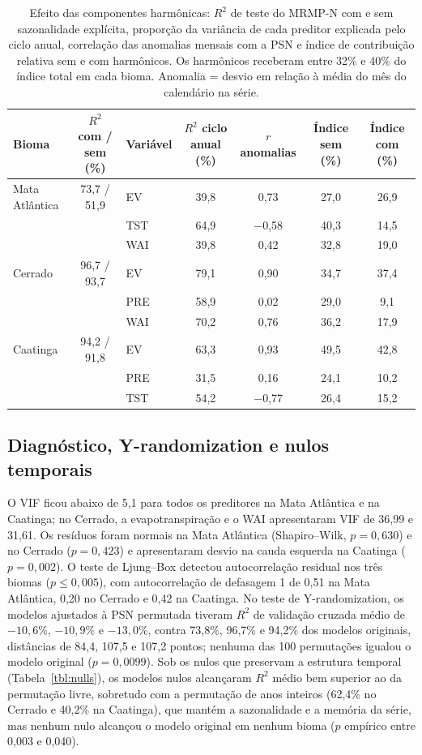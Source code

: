 \documentclass[a4paper,fleqn]{cas-sc}
\begin{document}
\begin{table}[htbp]
\caption{Efeito das componentes harmônicas: $R^2$ de teste do MRMP-N com e sem sazonalidade explícita, proporção da variância de cada preditor explicada pelo ciclo anual, correlação das anomalias mensais com a PSN e índice de contribuição relativa sem e com harmônicos. Os harmônicos receberam entre 32\% e 40\% do índice total em cada bioma. Anomalia = desvio em relação à média do mês do calendário na série.}\label{tbl:harm}
\scriptsize
\begin{tabular*}{\tblwidth}{@{}LCLCCCC@{}}
\toprule
Bioma & $R^2$ com / sem (\%) & Variável & $R^2$ ciclo anual (\%) & $r$ anomalias & Índice sem (\%) & Índice com (\%) \\
\midrule
Mata Atlântica & 73,7 / 51,9 & EV & 39,8 & 0,73 & 27,0 & 26,9 \\
 & & TST & 64,9 & $-$0,58 & 40,3 & 14,5 \\
 & & WAI & 39,8 & 0,42 & 32,8 & 19,0 \\
Cerrado & 96,7 / 93,7 & EV & 79,1 & 0,90 & 34,7 & 37,4 \\
 & & PRE & 58,9 & 0,02 & 29,0 & 9,1 \\
 & & WAI & 70,2 & 0,76 & 36,2 & 17,9 \\
Caatinga & 94,2 / 91,8 & EV & 63,3 & 0,93 & 49,5 & 42,8 \\
 & & PRE & 31,5 & 0,16 & 24,1 & 10,2 \\
 & & TST & 54,2 & $-$0,77 & 26,4 & 15,2 \\
\bottomrule
\end{tabular*}
\end{table}

\subsection{Diagnóstico, Y-randomization e nulos temporais}

O VIF ficou abaixo de 5,1 para todos os preditores na Mata Atlântica e na Caatinga; no Cerrado, a evapotranspiração e o WAI apresentaram VIF de 36,99 e 31,61. Os resíduos foram normais na Mata Atlântica (Shapiro--Wilk, $p = 0,630$) e no Cerrado ($p = 0,423$) e apresentaram desvio na cauda esquerda na Caatinga ($p = 0,002$). O teste de Ljung--Box detectou autocorrelação residual nos três biomas ($p \le 0,005$), com autocorrelação de defasagem 1 de 0,51 na Mata Atlântica, 0,20 no Cerrado e 0,42 na Caatinga. No teste de Y-randomization, os modelos ajustados à PSN permutada tiveram $R^2$ de validação cruzada médio de $-10,6\%$, $-10,9\%$ e $-13,0\%$, contra 73,8\%, 96,7\% e 94,2\% dos modelos originais, distâncias de 84,4, 107,5 e 107,2 pontos; nenhuma das 100 permutações igualou o modelo original ($p = 0,0099$). Sob os nulos que preservam a estrutura temporal (Tabela~\ref{tbl:nulls}), os modelos nulos alcançaram $R^2$ médio bem superior ao da permutação livre, sobretudo com a permutação de anos inteiros (62,4\% no Cerrado e 40,2\% na Caatinga), que mantém a sazonalidade e a memória da série, mas nenhum nulo alcançou o modelo original em nenhum bioma ($p$ empírico entre 0,003 e 0,040).
\end{document}
